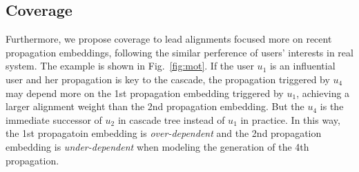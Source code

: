 \subsection{Coverage}
\label{sec:coverage}

Furthermore, we propose coverage to lead alignments focused more on 
recent propagation embeddings, following the similar perference of users'
interests in real system. The example is shown in
Fig.~\ref{fig:mot}.
If the user $u_1$ is an influential user and her propagation is key to the
cascade, the propagation triggered by $u_4$ may depend more on the 1st
propagation embedding triggered by $u_1$, achieving a larger alignment
weight than the 2nd propagation embedding. But the $u_4$ is the
immediate successor of $u_2$ in cascade tree instead of $u_1$ in practice.
In this way, the 1st propagatoin embedding is \emph{over-dependent} and the
2nd propagation embedding is \emph{under-dependent} when modeling the
generation of the 4th propagation.

%  


